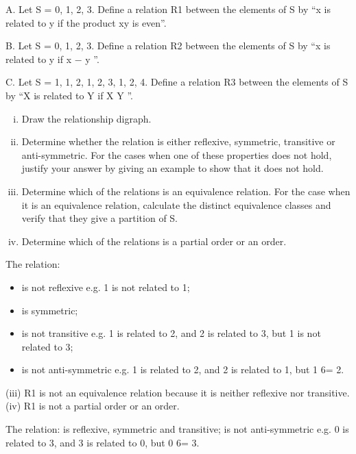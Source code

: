 A. Let S = {0, 1, 2, 3}. 
Define a relation R1 between the elements of S by
“x is related to y if the product xy is even”.

B. Let S = {0, 1, 2, 3}. 
Define a relation R2 between the elements of S by
“x is related to y if x − y ”.

C. Let S = {{1}, {1, 2}, {1, 2, 3}, {1, 2, 4}}. 
Define a relation R3 between
the elements of S by “X is related to Y if X \subseteq Y ”.
\begin{enumerate}[(i)]
\item Draw the relationship digraph.
\item Determine whether the relation is either reflexive, symmetric, transitive
or anti-symmetric. For the cases when one of these properties
does not hold, justify your answer by giving an example to show that
it does not hold.

\item Determine which of the relations is an equivalence relation. For the
case when it is an equivalence relation, calculate the distinct equivalence
classes and verify that they give a partition of S.
\item Determine which of the relations is a partial order or an order.
\end{enumerate}

The relation:
\begin{itemize}
\item is not reflexive e.g. 1 is not related to 1;
\item is symmetric;
\item is not transitive e.g. 1 is related to 2, and 2 is related to 3, but 1
is not related to 3;
\item is not anti-symmetric e.g. 1 is related to 2, and 2 is related to 1,
but 1 6= 2.
\end{itemize}

(iii) R1 is not an equivalence relation because it is neither reflexive
nor transitive.
(iv) R1 is not a partial order or an order.


The relation:
is reflexive, symmetric and transitive;
is not anti-symmetric e.g. 0 is related to 3, and 3 is related to 0,
but 0 6= 3.

